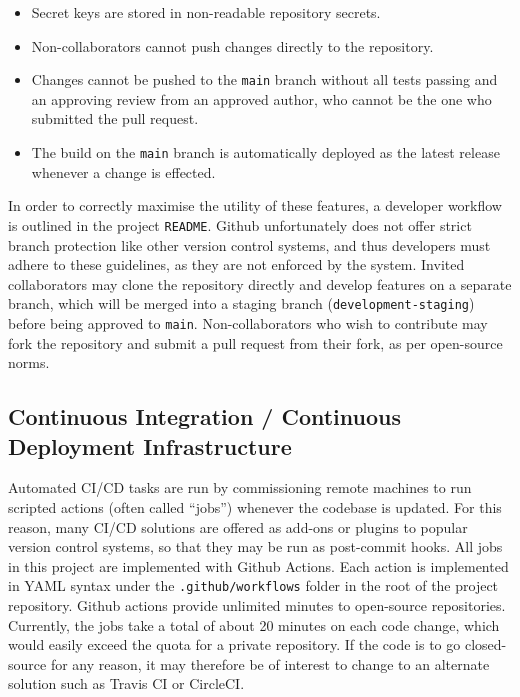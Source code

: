 \begin{itemize}
    \item Secret keys are stored in non-readable repository secrets.
    \item Non-collaborators cannot push changes directly to the repository.
    \item Changes cannot be pushed to the \texttt{main} branch without all tests passing and an approving review from an approved author, who cannot be the one who submitted the pull request.
    \item The build on the \texttt{main} branch is automatically deployed as the latest release whenever a change is effected.
\end{itemize}

In order to correctly maximise the utility of these features, a developer workflow is outlined in the project \texttt{README}. Github unfortunately does not offer strict branch protection like other version control systems, and thus developers must adhere to these guidelines, as they are not enforced by the system. Invited collaborators may clone the repository directly and develop features on a separate branch, which will be merged into a staging branch (\texttt{development-staging}) before being approved to \texttt{main}. Non-collaborators who wish to contribute may fork the repository and submit a pull request from their fork, as per open-source norms.


\subsection{Continuous Integration / Continuous Deployment Infrastructure}
Automated CI/CD tasks are run by commissioning remote machines to run scripted actions (often called ``jobs'') whenever the codebase is updated. For this reason, many CI/CD solutions are offered as add-ons or plugins to popular version control systems, so that they may be run as post-commit hooks. All jobs in this project are implemented with Github Actions. Each action is implemented in YAML syntax under the \texttt{.github/workflows} folder in the root of the project repository. Github actions provide unlimited minutes to open-source repositories. Currently, the jobs take a total of about 20 minutes on each code change, which would easily exceed the quota for a private repository. If the code is to go closed-source for any reason, it may therefore be of interest to change to an alternate solution such as Travis CI or CircleCI.


